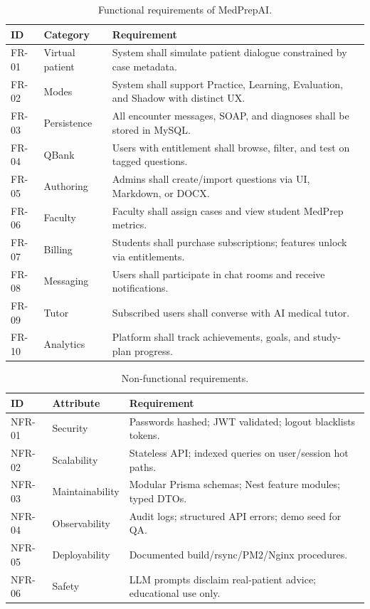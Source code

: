 \begin{table}[htbp]
  \centering
  \caption{Functional requirements of MedPrepAI.}
  \label{tab:requirements}
  \small
  \begin{tabular}{@{}p{1.2cm}p{4.2cm}p{7.8cm}@{}}
    \toprule
    \textbf{ID} & \textbf{Category} & \textbf{Requirement} \\
    \midrule
    FR-01 & Virtual patient & System shall simulate patient dialogue constrained by case metadata. \\
    FR-02 & Modes & System shall support Practice, Learning, Evaluation, and Shadow with distinct UX. \\
    FR-03 & Persistence & All encounter messages, SOAP, and diagnoses shall be stored in MySQL. \\
    FR-04 & QBank & Users with entitlement shall browse, filter, and test on tagged questions. \\
    FR-05 & Authoring & Admins shall create/import questions via UI, Markdown, or DOCX. \\
    FR-06 & Faculty & Faculty shall assign cases and view student MedPrep metrics. \\
    FR-07 & Billing & Students shall purchase subscriptions; features unlock via entitlements. \\
    FR-08 & Messaging & Users shall participate in chat rooms and receive notifications. \\
    FR-09 & Tutor & Subscribed users shall converse with AI medical tutor. \\
    FR-10 & Analytics & Platform shall track achievements, goals, and study-plan progress. \\
    \bottomrule
  \end{tabular}
\end{table}

\begin{table}[htbp]
  \centering
  \caption{Non-functional requirements.}
  \label{tab:nfr}
  \small
  \begin{tabular}{@{}p{1.2cm}p{3.5cm}p{8.5cm}@{}}
    \toprule
    \textbf{ID} & \textbf{Attribute} & \textbf{Requirement} \\
    \midrule
    NFR-01 & Security & Passwords hashed; JWT validated; logout blacklists tokens. \\
    NFR-02 & Scalability & Stateless API; indexed queries on user/session hot paths. \\
    NFR-03 & Maintainability & Modular Prisma schemas; Nest feature modules; typed DTOs. \\
    NFR-04 & Observability & Audit logs; structured API errors; demo seed for QA. \\
    NFR-05 & Deployability & Documented build/rsync/PM2/Nginx procedures. \\
    NFR-06 & Safety & LLM prompts disclaim real-patient advice; educational use only. \\
    \bottomrule
  \end{tabular}
\end{table}


